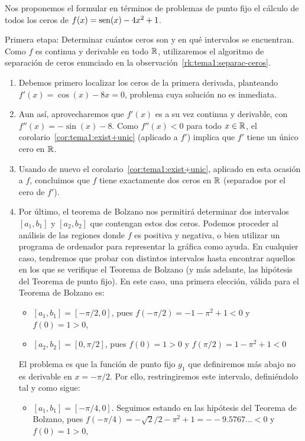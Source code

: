 \begin{example}
  Nos proponemos el formular en términos de problemas de punto fijo el
  cálculo de todos los ceros de $f(x)=\operatorname{sen}(x)-4x^2+1$.


  \textsf{Primera etapa:} Determinar cuántos ceros son y en qué
  intervalos se encuentran. Como $f$ es continua y derivable en todo
  $\operatorname{{\mathbb R}}$, utilizaremos el algoritmo de separación de ceros enunciado
  en la observación~\ref{rk:tema1:separac-ceros}.
  \begin{enumerate}
  \item Debemos primero localizar los ceros de la primera
    derivada, planteando $f'(x)=\cos(x)-8x=0$, problema cuya solución
    no es inmediata.
  \item Aun así, aprovecharemos que $f'(x)$ es a su vez continua y
    derivable, con $f''(x)=-\sin(x)-8$. Como $f''(x)<0$ para todo
    $x\in\operatorname{{\mathbb R}}$, el corolario~\ref{cor:tema1:exist+unic} (aplicado a
    $f'$) implica que $f'$ tiene un único cero en $\operatorname{{\mathbb R}}$.
  \item Usando de nuevo el
    corolario~\ref{cor:tema1:exist+unic}, aplicado en esta ocasión a
    $f$, concluimos que $f$ tiene exactamente dos ceros en $\operatorname{{\mathbb R}}$
    (separados por el cero de $f'$).
  \item Por último, el teorema de Bolzano nos permitirá determinar dos
    intervalos $[a_1,b_1]$ y $[a_2,b_2]$ que contengan estos dos
    ceros. Podemos proceder al análisis de las regiones donde $f$ es
    positiva y negativa, o bien utilizar un programa de ordenador para
    representar la gráfica como ayuda. En cualquier caso, tendremos
    que probar con distintos intervalos hasta encontrar aquellos en
    los que se verifique el Teorema de Bolzano (y más adelante, las
    hipótesis del Teorema de punto fijo). En este caso, una primera
    elección, válida para el Teorema de Bolzano es:
    \begin{itemize}
    \item $[a_1,b_1]=[-\pi/2, 0]$, pues $f(-\pi/2)=-1-\pi^2+1<0$ y
      $f(0)=1>0$,
    \item $[a_2,b_2]=[0, \pi/2]$, pues $f(0)=1>0$ y $f(\pi/2)= 1-\pi^2+1<0$
    \end{itemize}
    El problema es que la función de punto fijo $g_1$ que definiremos
    más abajo no es derivable en $x=-\pi/2$. Por ello, restringiremos
    este intervalo, definiéndolo tal y como sigue:
    \begin{itemize}
    \item $[a_1,b_1]=[-\pi/4, 0]$. Seguimos estando en las hipótesis
      del Teorema de Bolzano, pues $f(-\pi/4)=
      -\sqrt{2}/2-\pi^2+1=--9.5767...<0$ y $f(0)=1>0$,
    \end{itemize}
  \end{enumerate}


\end{example}
